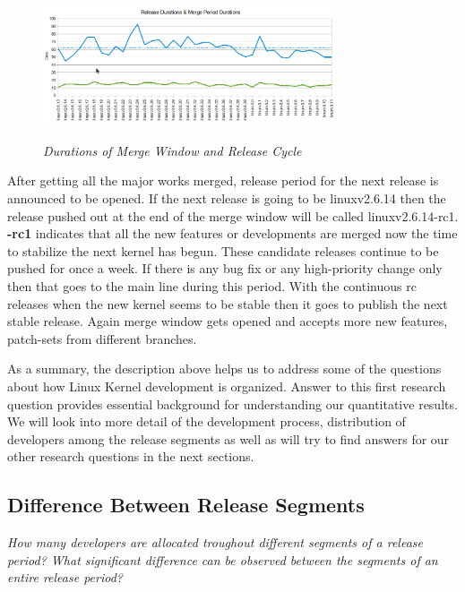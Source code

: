 \documentclass{acm_proc_article-sp}
\begin{document}
\begin{figure}
\begin{center}
\includegraphics[height=1.7in,width=3.4in]{linxrelmergfreq.png}
\caption{\small \sl Durations of Merge Window and Release Cycle}
\end{center}
\end{figure}

After getting all the major works merged, release period for the next release is announced to be opened. If the next release is going to be linuxv2.6.14 then the release pushed out at the end of the merge window will be called linuxv2.6.14-rc1. \textbf{-rc1} indicates that all the new features or developments are merged now the time to stabilize the next kernel has begun. These candidate releases continue to be pushed for once a week. If there is any bug fix or any high-priority change only then that goes to the main line during this period. With the continuous rc releases when the new kernel seems to be stable then it goes to publish the next stable release. Again merge window gets opened and accepts more new features, patch-sets from different branches.

As a summary, the description above helps us to address some of the questions about how Linux Kernel development is organized. Answer to this first research question provides essential background for understanding our quantitative results. We will look into more detail of the development process, distribution of developers among the release segments as well as will try to find answers for our other research questions in the next sections.

\subsection{Difference Between Release Segments}
\textit{How many developers are allocated troughout different segments of a release period? What significant difference can be observed between the segments of an entire release period?}
\end{document}

